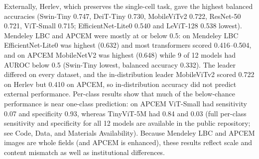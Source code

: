 \documentclass[12pt,letterpaper]{article}
\begin{document}
Externally, Herlev, which preserves the single-cell task, gave the highest balanced accuracies (Swin-Tiny 0.747, DeiT-Tiny 0.730, MobileViTv2 0.722, ResNet-50 0.721, ViT-Small 0.715; EfficientNet-Lite0 0.540 and LeViT-128 0.538 lowest). Mendeley LBC and APCEM were mostly at or below 0.5: on Mendeley LBC EfficientNet-Lite0 was highest (0.632) and most transformers scored 0.416--0.504, and on APCEM MobileNetV2 was highest (0.648) while 9 of 12 models had AUROC below 0.5 (Swin-Tiny lowest, balanced accuracy 0.332). The leader differed on every dataset, and the in-distribution leader MobileViTv2 scored 0.722 on Herlev but 0.410 on APCEM, so in-distribution accuracy did not predict external performance. Per-class results show that much of the below-chance performance is near one-class prediction: on APCEM ViT-Small had sensitivity 0.07 and specificity 0.93, whereas TinyViT-5M had 0.84 and 0.03 (full per-class sensitivity and specificity for all 12 models are available in the public repository; see Code, Data, and Materials Availability). Because Mendeley LBC and APCEM images are whole fields (and APCEM is enhanced), these results reflect scale and content mismatch as well as institutional differences.
\end{document}

